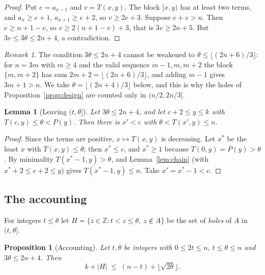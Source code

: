 \documentclass[11pt]{amsart}
\newtheorem{proposition}[theorem]{Proposition}
\newtheorem{lemma}[theorem]{Lemma}
\theoremstyle{remark}
\newtheorem{remark}[theorem]{Remark}
\newcommand{\Z}{\mathbb{Z}}
\newcommand{\isqrt}[1]{\lfloor\sqrt{#1}\rfloor}
\begin{document}
\begin{proof}
Put $e=a_{x-1}$ and $v=T(x,y)$. The block $[x,y)$ has at least two terms, and $a_x\ge e+1$, $a_{x+1}\ge e+2$, so $v\ge 2e+3$. Suppose
$e+v>n$. Then $e\ge n+1-v$, so $v\ge 2(n+1-v)+3$, that is $3v\ge 2n+5$. But $3v\le3\theta\le 2n+4$, a contradiction.
\end{proof}

\begin{remark}\label{rem:chainsharp}
The condition $3\theta\le 2n+4$ cannot be weakened to $\theta\le\lfloor(2n+6)/3\rfloor$: for $n=3m$ with $m\ge4$ and the valid sequence $m-1,m,m+2$ the
block $\{m,m+2\}$ has sum $2m+2=\lfloor(2n+6)/3\rfloor$, and adding $m-1$ gives $3m+1>n$. We take $\theta=\lfloor(2n+4)/3\rfloor$ below,
and this is why the holes of Proposition~\ref{prop:design} are counted only in $(n/2,2n/3]$.
\end{remark}

\begin{lemma}[{Leaving $(t,\theta]$}]\label{lem:beyond}
Let $3\theta\le 2n+4$, and let $c+2\le y\le k$ with $T(c,y)\le\theta<P(y)$. Then there is $x'<c$ with $\theta<T(x',y)\le n$.
\end{lemma}

\begin{proof}
Since the terms are positive, $x\mapsto T(x,y)$ is decreasing. Let $x^*$ be the least $x$ with $T(x,y)\le\theta$; then $x^*\le c$, and
$x^*\ge1$ because $T(0,y)=P(y)>\theta$. By minimality $T(x^*-1,y)>\theta$, and Lemma~\ref{lem:chain} (with $x^*+2\le c+2\le y$) gives
$T(x^*-1,y)\le n$. Take $x'=x^*-1<c$.
\end{proof}

\subsection{The accounting}

For integers $t\le\theta$ let $H=\{z\in\Z:t<z\le\theta,\ z\notin A\}$ be the set of \emph{holes} of $A$ in $(t,\theta]$.

\begin{proposition}[Accounting]\label{prop:account}
Let $t,\theta$ be integers with $0\le 2t\le n$, $t\le\theta\le n$ and $3\theta\le 2n+4$. Then
\[
  k+|H|\;\le\;(n-t)+\isqrt{2\theta}.
\]
\end{proposition}
\end{document}
